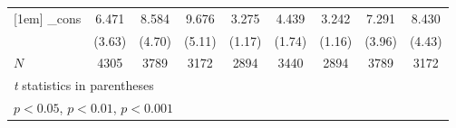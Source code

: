\documentclass{article}
\begin{document}
{\begin{tabular}{l*{8}{c}}
[1em]
\_cons      &       6.471\sym{***}&       8.584\sym{***}&       9.676\sym{***}&       3.275         &       4.439         &       3.242         &       7.291\sym{***}&       8.430\sym{***}\\
            &      (3.63)         &      (4.70)         &      (5.11)         &      (1.17)         &      (1.74)         &      (1.16)         &      (3.96)         &      (4.43)         \\
\hline
\(N\)       &        4305         &        3789         &        3172         &        2894         &        3440         &        2894         &        3789         &        3172         \\
\hline\hline
\multicolumn{9}{l}{\footnotesize \textit{t} statistics in parentheses}\\
\multicolumn{9}{l}{\footnotesize \sym{*} \(p<0.05\), \sym{**} \(p<0.01\), \sym{***} \(p<0.001\)}\\
\end{tabular}
}

















\end{document}
